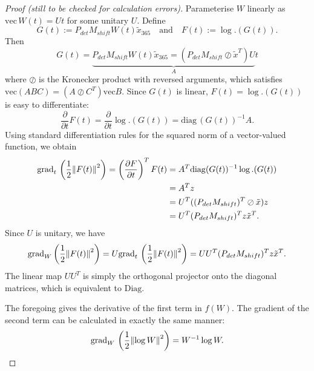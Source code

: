 \documentclass{article}
\begin{document}
\begin{proof}[Proof (still to be checked for calculation errors)]

Parameterise $W$ linearly as $\mathrm{vec}\, W(t) = U t$ for some unitary $U$.
Define $$
G(t) := 
P_{det} M_{shift} W(t) \tilde{x}_{365}
\quad\text{and}\quad
F(t) := \log.(G(t))
.$$
Then 
$$
G(t) = \underbrace{P_{det} M_{shift} W(t) \tilde{x}_{365} = (P_{det}M_{shift} \oslash \tilde{x}^T) U}_A t
$$
where $\oslash$ is the Kronecker product with reversed arguments, which satisfies $\mathrm{vec}(A B C) = (A \oslash C^T) \mathrm{vec} B$.
Since $G(t)$ is linear, $F(t) = \log.(G(t))$ is easy to differentiate:
$$
\frac{\partial}{\partial t} F(t) =
\frac{\partial}{\partial t} \log.(G(t)) = \mathrm{diag}\,(G(t))^{-1} A
.$$
Using standard differentiation rules for the squared norm of a vector-valued function, we obtain
\begin{align*}
\mathrm{grad}_t\, \left(\frac{1}{2} \norm{F(t)}^2 \right) = \left(\frac{\partial F}{\partial t}\right)^T F(t)
&= A^T \mathrm{diag}(G(t))^{-1} \log.(G(t)) \\
&= A^T z \\
&= U^T ((P_{det} M_{shift})^T \oslash \tilde{x}) z \\
&= U^T (P_{det} M_{shift})^T z \tilde{x}^T
.
\end{align*}
Since $U$ is unitary, we have $$
\mathrm{grad}_W \left(\frac{1}{2} \norm{F(t)}^2 \right)
=
U \mathrm{grad}_t\, \left(\frac{1}{2} \norm{F(t)}^2 \right)
=
UU^T (P_{det} M_{shift})^T z \tilde{x}^T
.$$
The linear map $UU^T$ is simply the orthogonal projector onto the diagonal matrices, which is equivalent to $\mathrm{Diag}$.

The foregoing gives the derivative of the first term in $f(W)$. The gradient of the second term can be calculated in exactly the same manner: 
$$
\mathrm{grad}_W\, \left(\frac{1}{2}\norm{\log W}^2\right) = W^{-1} \log W
.$$
\end{proof}


\printbibliography
\end{document}
